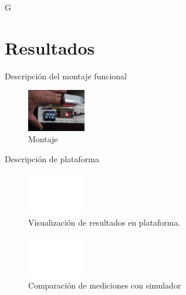 \documentclass[journal]{IEEEtran}
\begin{document}
{\color{blue}G}
\section{Resultados}

Descripción del montaje funcional

\begin{figure}[!h]
	\centering
	\includegraphics[width=1in]{montaje_final.png}
	\caption{Montaje}
	\label{montaje_generador_rpi}
\end{figure}


Descripción de plataforma

\begin{figure}[!h]
	\centering
	\includegraphics[width=1in]{plataforma.png}
	\caption{Visualización de resultados en plataforma.}
	\label{montaje_generador_rpi}
\end{figure}

\begin{figure}[!h]
	\centering
	\includegraphics[width=1in]{Validacion_resultados.png}
	\caption{Comparación de mediciones con simulador}
	\label{montaje_generador_rpi}
\end{figure}

%
\end{document}
